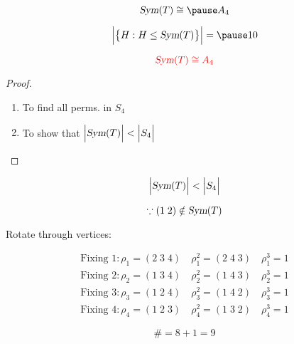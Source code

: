 
\begin{frame}

  \[
	\sym(T) \cong \pause A_4
  \]

  \pause
  \vspace{-0.30cm}
  \[
	\Big\lvert \big\{H: H \le \sym(T)\big\} \Big\rvert = \pause 10
  \]
\end{frame}

\begin{frame}

  \[
	\textcolor{red}{\textsl{Sym}(T) \cong A_4}
  \]

  \pause
  \begin{proof}
	\begin{enumerate}[(1)]
		\centering
	  \item To find all  perms. in $S_4$ 
		\pause
	  \item To show that $\Big\lvert \textsl{Sym}(T) \Big\rvert < \Big\lvert S_4 \Big\rvert$
	\end{enumerate}
  \end{proof}
\end{frame}

\begin{frame}

  \[
	\Big\lvert \textsl{Sym}(T) \Big\rvert < \Big\lvert S_4 \Big\rvert
  \]

  \pause
  \[
	\because (1\; 2) \notin \textsl{Sym}(T)
  \]
\end{frame}

\begin{frame}
  \begin{center}
	Rotate through vertices:
  \end{center}

  \begin{align*}
	\text{Fixing } 1: \rho_{1} = (2\; 3\; 4)\quad \rho_{1}^{2} = (2\; 4\; 3)\quad \rho_{1}^{3} = 1 \\[6pt]
	\text{Fixing } 2: \rho_{2} = (1\; 3\; 4)\quad \rho_{2}^{2} = (1\; 4\; 3)\quad \rho_{2}^{3} = 1 \\[6pt]
	\text{Fixing } 3: \rho_{3} = (1\; 2\; 4)\quad \rho_{3}^{2} = (1\; 4\; 2)\quad \rho_{3}^{3} = 1 \\[6pt]
	\text{Fixing } 4: \rho_{4} = (1\; 2\; 3)\quad \rho_{4}^{2} = (1\; 3\; 2)\quad \rho_{4}^{3} = 1
  \end{align*}

  \pause
  \[
	\# = 8 + 1 = 9
  \]
\end{frame}

